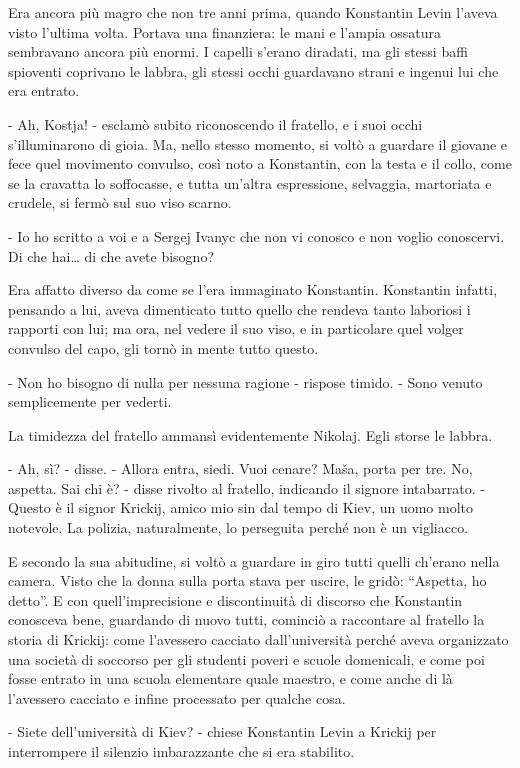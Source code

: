 Era ancora più magro che non tre anni prima, quando Konstantin Levin l'aveva visto l'ultima volta. Portava una finanziera: le mani e l'ampia ossatura sembravano ancora più enormi. I capelli s'erano diradati, ma gli stessi baffi spioventi coprivano le labbra, gli stessi occhi guardavano strani e ingenui lui che era entrato. 

- Ah, Kostja! - esclamò subito riconoscendo il fratello, e i suoi occhi s'illuminarono di gioia. Ma, nello stesso momento, si voltò a guardare il giovane e fece quel movimento convulso, così noto a Konstantin, con la testa e il collo, come se la cravatta lo soffocasse, e tutta un'altra espressione, selvaggia, martoriata e crudele, si fermò sul suo viso scarno. 

- Io ho scritto a voi e a Sergej Ivanyc che non vi conosco e non voglio conoscervi. Di che hai\ldots{} di che avete bisogno? 

Era affatto diverso da come se l'era immaginato Konstantin. Konstantin infatti, pensando a lui, aveva dimenticato tutto quello che rendeva tanto laboriosi i rapporti con lui; ma ora, nel vedere il suo viso, e in particolare quel volger convulso del capo, gli tornò in mente tutto questo. 

- Non ho bisogno di nulla per nessuna ragione - rispose timido. - Sono venuto semplicemente per vederti. 

La timidezza del fratello ammansì evidentemente Nikolaj. Egli storse le labbra. 

- Ah, sì? - disse. - Allora entra, siedi. Vuoi cenare? Maša, porta per tre. No, aspetta. Sai chi è? - disse rivolto al fratello, indicando il signore intabarrato. - Questo è il signor Krickij, amico mio sin dal tempo di Kiev, un uomo molto notevole. La polizia, naturalmente, lo perseguita perché non è un vigliacco. 

E secondo la sua abitudine, si voltò a guardare in giro tutti quelli ch'erano nella camera. Visto che la donna sulla porta stava per uscire, le gridò: ``Aspetta, ho detto''. E con quell'imprecisione e discontinuità di discorso che Konstantin conosceva bene, guardando di nuovo tutti, cominciò a raccontare al fratello la storia di Krickij: come l'avessero cacciato dall'università perché aveva organizzato una società di soccorso per gli studenti poveri e scuole domenicali, e come poi fosse entrato in una scuola elementare quale maestro, e come anche di là l'avessero cacciato e infine processato per qualche cosa. 

- Siete dell'università di Kiev? - chiese Konstantin Levin a Krickij per interrompere il silenzio imbarazzante che si era stabilito. 

